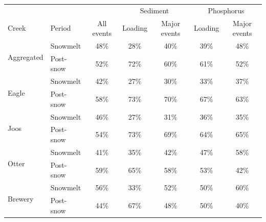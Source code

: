 \documentclass[12pt]{article}
\begin{document}
\begin{table}[h]
    \begin{center}
    \begin{tabular}{llccccc}
        &  &  & \multicolumn{2}{c}{Sediment} & \multicolumn{2}{c}{Phosphorus} \\
        Creek & Period & All events & Loading & Major events & Loading & Major events \\
        \hline 
        \multirow{2}{*}{Aggregated} & Snowmelt & 
        48\% &
        28\% & 
        40\% & 
        39\% & 
        48\% \\
        & Post-snow & 
        52\% &
        72\% & 
        60\% & 
        61\% & 
        52\%
        
        \vspace{2mm}\\
        
        \multirow{2}{*}{Eagle} & Snowmelt & 
        42\% &
        27\% & 
        30\% & 
        33\% & 
        37\% \\
        & Post-snow & 
        58\% &
        73\% & 
        70\% & 
        67\% & 
        63\%
        
        \vspace{2mm}\\
        
        \multirow{2}{*}{Joos} & Snowmelt & 
        46\% &
        27\% & 
        31\% & 
        36\% & 
        35\% \\
        & Post-snow & 
        54\% &
        73\% & 
        69\% & 
        64\% & 
        65\% 
        
        \vspace{2mm}\\
        
        \multirow{2}{*}{Otter} & Snowmelt & 
        41\% &
        35\% & 
        42\% & 
        47\% & 
        58\% \\
        & Post-snow & 
        59\% &
        65\% & 
        58\% & 
        53\% & 
        42\% 
        
        \vspace{2mm}\\

        \multirow{2}{*}{Brewery} & Snowmelt & 
        56\% &
        33\% & 
        52\% & 
        50\% & 
        60\% \\
        & Post-snow & 
        44\% &
        67\% & 
        48\% & 
        50\% & 
        40\% \\
    \end{tabular}
    \end{center}
\end{table}
\end{document}
